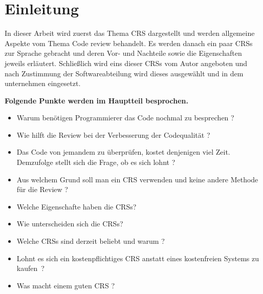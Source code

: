 \section{Einleitung}

In dieser Arbeit wird zuerst das Thema \ac{CRS} dargestellt und werden allgemeine Aspekte vom Thema Code review behandelt.
Es werden danach ein paar \acp{CRS} zur Sprache gebracht und deren Vor- und Nachteile sowie die Eigenschaften jeweils erläutert.
Schließlich wird eins dieser \acp{CRS} vom Autor angeboten und nach Zustimmung der Softwareabteilung wird dieses ausgewählt und in dem unternehmen eingesetzt.

\vspace{2cm}
\textbf{Folgende Punkte werden im Hauptteil besprochen.}

\begin{itemize}
\item Warum benötigen Programmierer das Code nochmal zu besprechen ?
\item Wie hilft die Review bei der Verbesserung der Codequalität ?
\item Das Code von jemandem zu überprüfen, kostet denjenigen viel Zeit. Demzufolge stellt sich die Frage, ob es sich lohnt ?
\item Aus welchem Grund soll man ein \ac{CRS} verwenden und keine andere Methode für die Review ?
\item Welche Eigenschafte haben die \acp{CRS}?
\item Wie unterscheiden sich die \acp{CRS}?
\item Welche \acp{CRS} sind derzeit beliebt und warum ?
\item Lohnt es sich ein kostenpflichtiges \ac{CRS} anstatt eines kostenfreien Systems zu kaufen~?
\item Was macht einem guten \ac{CRS} ?
\end{itemize}

\newpage
\listoftodos